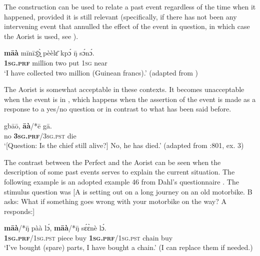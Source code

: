 \documentclass[output=paper]{LSP/langsci}
\begin{document}
The  construction can be used to relate a past event regardless of the time when it happened, provided it is still relevant (specifically, if there has not been any intervening event that annulled the effect of the event in question, in which case the Aorist is used, see ). 

\begin{exe}
\ex
\gll \textbf{māà} mīnīɔ̰̄ɔ̰̀  pèèlɛ̄ kpɔ́ ŋ̄ sɔ́nɔ́.\\
\textbf{1\textsc{sg}.\textsc{prf}} million two put 1\textsc{sg} near\\
 `I have collected two million (Guinean francs).' (adapted from \citealt[803, ex. 42]{khachdahl2000})
\end{exe}

The Aorist is somewhat acceptable in these contexts. It becomes unacceptable when the event is in , which happens when the assertion of the event is made as a response to a yes/no question or in contrast to what has been said before.

\begin{exe} \ex
\gll gbāō, \textbf{āà}/*ē gā.\\
no \textbf{3\textsc{sg.prf}}/3\textsc{sg.pst} die\\
\glt `[Question: Is the chief still alive?] No, he has died.' (adapted from \citealt{khachdahl2000}:801, ex. 3)
\end{exe}

The contrast between the Perfect and the Aorist can be seen when the description of some past events serves to explain the current situation. The following example is an adopted example 46 from Dahl's questionnaire \citep[803]{khachdahl2000}. The stimulus question was [A is setting out on a long journey on an old motorbike. B asks: What if something goes wrong with your motorbike on the way? A responds:]

\begin{exe}\ex
\label{khachexmoto}
\gll \textbf{māà}/*ŋ̄ pàà lɔ́, \textbf{māà}/*ŋ̄ sɛ́ɛ̀nè lɔ́. \\
\textbf{1\textsc{sg.prf}}/1\textsc{sg.pst} piece buy \textbf{1\textsc{sg.prf}}/1\textsc{sg.pst} chain buy\\
\glt `I've bought (spare) parts, I have bought a chain.' (I can replace them if needed.)
\end{exe}
\end{document}
